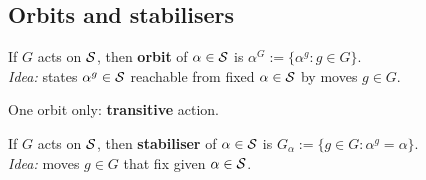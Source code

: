 \begin{slide}
\begin{example}
\begin{center}
        \end{center}
    \end{example}
\end{slide}

\subsection{Orbits and stabilisers}

\begin{slide}
    \begin{definition}[orbit]
        \vspace{0pt}
        If $G$ acts on $\mathcal{S}$, then \textbf{orbit} of $\alpha \in \mathcal{S}$ is $\alpha^G := \{\alpha^g : g \in G\}$. \\
        \textit{Idea:} states $\alpha^g \in \mathcal{S}$ reachable from fixed $\alpha \in \mathcal{S}$ by moves $g \in G$.
    \end{definition}

    One orbit only: \textbf{transitive} action. \pause

    \begin{definition}[stabiliser]
        \vspace{0pt}
        If $G$ acts on $\mathcal{S}$, then \textbf{stabiliser} of $\alpha \in \mathcal{S}$ is $G_\alpha := \{g \in G : \alpha^g = \alpha\}$. \\
        \textit{Idea:} moves $g \in G$ that fix given $\alpha \in \mathcal{S}$.
    \end{definition}
\end{slide}

